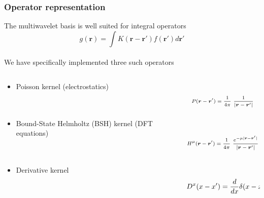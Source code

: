 \documentclass[mathserif]{beamer}
\begin{document}
\begin{frame}
    \frametitle{Operator representation}
    The multiwavelet basis is well suited for integral operators
    \begin{equation}
	\nonumber
	g(\boldsymbol{r}) = \int K(\boldsymbol{r} - \boldsymbol{r'}) 
	    f(\boldsymbol{r'}) d\boldsymbol{r'}
    \end{equation}
    \ \\
    We have specifically implemented three such operators
    \ \\
    \begin{columns}
    \begin{column}{.48\textwidth}
    \begin{itemize}
	\item Poisson kernel (electrostatics)
	    \ \\
	    \ \\
	    \ \\
	\item Bound-State Helmholtz (BSH) kernel (DFT equations)
	    \ \\
	    \ \\
	    \ \\
	\item Derivative kernel
    \end{itemize}
    \end{column}
    \begin{column}{.48\textwidth}
    \ \\
    \begin{equation}
	\nonumber
	\scriptsize
	P(\boldsymbol{r}-\boldsymbol{r}') = 
	    \frac{1}{4\pi}\ \frac{1}{|\boldsymbol{r}-\boldsymbol{r}'|}
    \end{equation}
    \ \\
    \ \\
    \begin{equation}
	\nonumber
	\scriptsize
	H^{\mu}(\boldsymbol{r}-\boldsymbol{r}') = \frac{1}{4\pi}\ 
	    \frac{e^{-\mu |\boldsymbol{r}-\boldsymbol{r}'|}}{|\boldsymbol{r}-\boldsymbol{r}'|}
    \end{equation}
    \ \\
    \ \\
    \begin{equation}
	\nonumber
	\scriptsize
	D^x(x-x') = \frac{d}{dx} \delta(x - x')
    \end{equation}
    \end{column}
    \end{columns}    
\end{frame}
\end{document}
